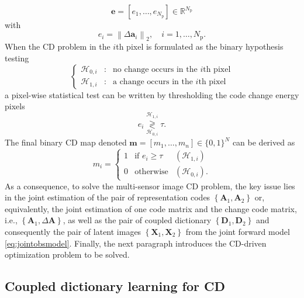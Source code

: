 \documentclass[review]{elsarticle}
\newcommand{\Npatch}{N_{\mathrm{p}}}
\begin{document}
\begin{equation}
\label{eq:change_energy_matrix}
  \mathbf{e} =\left[e_1,\ldots,e_{\Npatch}\right]\in \mathbb{R}^{\Npatch}
\end{equation}
with
\begin{equation*}
  e_i = \left\|\Delta\mathbf{a}_i\right\|_2, \quad i=1,\ldots,\Npatch.
\end{equation*}
When the CD problem in the $i$th pixel is formulated as the binary hypothesis testing
\begin{equation*}
\label{eq:test}
 \left\{
		\begin{array}{rcl}
			\mathcal{H}_{0,i} &:& \text{no change occurs in the $i$th pixel}  \\
			\mathcal{H}_{1,i} &:& \text{a change occurs in the $i$th pixel}
		\end{array}
        \right.
\end{equation*}
a pixel-wise statistical test can be written by thresholding the code change energy pixels
\begin{equation*}
    \label{eq:decision_rule}
  e_i \overset{\mathcal{H}_{1,i}}{\underset{\mathcal{H}_{0,i}}{\gtrless}} \tau.
\end{equation*}
The final binary CD map denoted ${\mathbf{m}} = \left[m_1,\ldots,m_n\right] \in \{0,1\}^N$ can be derived as
\begin{equation*}
	\label{eq:CVArule}
 {m}_i = \left\{\begin{array}{lll}
             1 & \mbox{if } e_i \geq \tau & (\mathcal{H}_{1,i})\\
			 0 & \mbox{otherwise}          & (\mathcal{H}_{0,i}).
				\end{array}\right.
\end{equation*}
As a consequence, to solve the multi-sensor image CD problem, the key issue lies in the joint estimation of the pair of representation codes $\left\{\mathbf{A}_{1},\mathbf{A}_{2}\right\}$ or, equivalently, the joint estimation of one code matrix and the change code matrix, i.e., $\left\{\mathbf{A}_{1},\Delta\mathbf{A}\right\}$, as well as the pair of coupled dictionary $\left\{\mathbf{D}_{1},\mathbf{D}_{2}\right\}$ and consequently the pair of latent images $\left\{\mathbf{X}_{1},\mathbf{X}_{2}\right\}$ from the joint forward model \eqref{eq:jointobsmodel}. Finally, the next paragraph introduces the CD-driven optimization problem to be solved.



\subsection{Coupled dictionary learning for CD}
\label{subsec:cdl}
\end{document}
